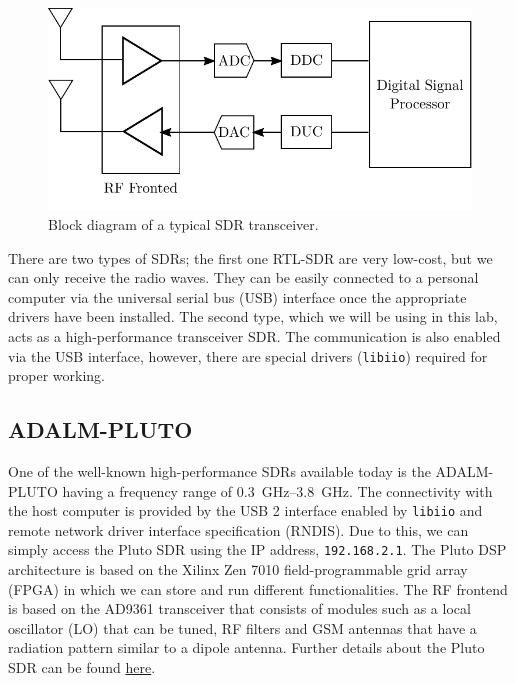 \documentclass[11pt]{article}
\begin{document}
\begin{figure}
  \centering
  \includegraphics[width=\linewidth]{block_diagram.pdf}
  \caption{Block diagram of a typical SDR transceiver.}
  \label{fig:SDR_block}
\end{figure}

There are two types of SDRs; the first one RTL-SDR are very low-cost, but we can only receive the radio waves. They can be easily connected to a personal computer via the universal serial bus (USB) interface once the appropriate drivers have been installed. The second type, which we will be using in this lab, acts as a high-performance transceiver SDR. The communication is also enabled via the USB interface, however, there are special drivers (\texttt{libiio}) required for proper working. 



\subsection{ADALM-PLUTO}
One of the well-known high-performance SDRs available today is the ADALM-PLUTO having a frequency range of \SIrange{0.3}{3.8}{\giga \hertz}. The connectivity with the host computer is provided by the USB 2 interface enabled by \texttt{libiio} and remote network driver interface specification (RNDIS). Due to this, we can simply access the Pluto SDR using the IP address, \texttt{192.168.2.1}. The Pluto DSP architecture is based on the Xilinx Zen 7010 field-programmable grid array (FPGA) in which we can store and run different functionalities. The RF frontend is based on the AD9361 transceiver that consists of modules such as a local oscillator (LO) that can be tuned, RF filters and GSM antennas that have a radiation pattern similar to a dipole antenna. Further details about the Pluto SDR can be found \href{https://wiki.analog.com/university/tools/pluto/users}{here}.
\end{document}
